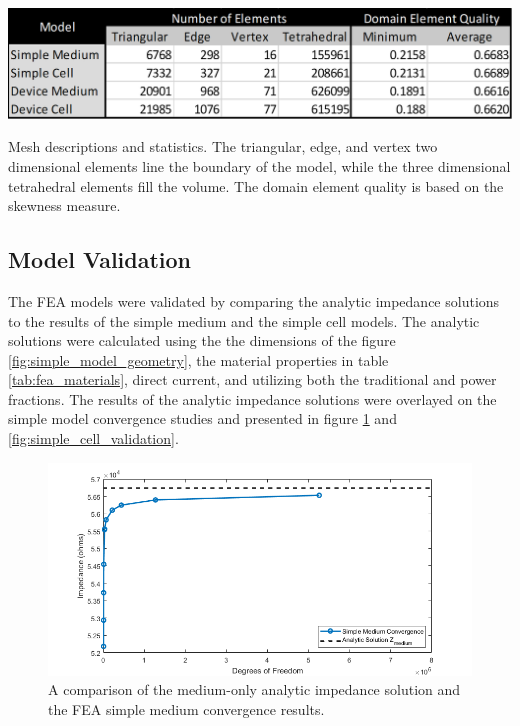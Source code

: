 \begin{table}[H]
    \centering
    \includegraphics[width=\textwidth]{images/meshStats.png}
    \caption[Mesh descriptions and statistics]{Mesh descriptions and statistics. The triangular, edge, and vertex two dimensional elements line the boundary of the model, while the three dimensional tetrahedral elements fill the volume. The domain element quality is based on the skewness measure.}
    \label{tab: meshStats}
\end{table}


\subsection{Model Validation}
\label{sec:model_validation}
\par The FEA models were validated by comparing the analytic impedance solutions to the results of the simple medium and the simple cell models. The analytic solutions were calculated using the the dimensions of the figure \ref{fig:simple_model_geometry}, the material properties in table \ref{tab:fea_materials}, direct current, and utilizing both the traditional and power fractions. The results of the analytic impedance solutions were overlayed on the simple model convergence studies and presented in figure \ref{fig:simple_medium_validation} and \ref{fig:simple_cell_validation}.

\begin{figure}[h]
    \centering
    \includegraphics[width=\textwidth]{images/simpeMediumValidation.png}
    \caption[Simple medium validation]{A comparison of the medium-only analytic impedance solution and the FEA simple medium convergence results.}
    \label{fig:simple_medium_validation}
\end{figure}

